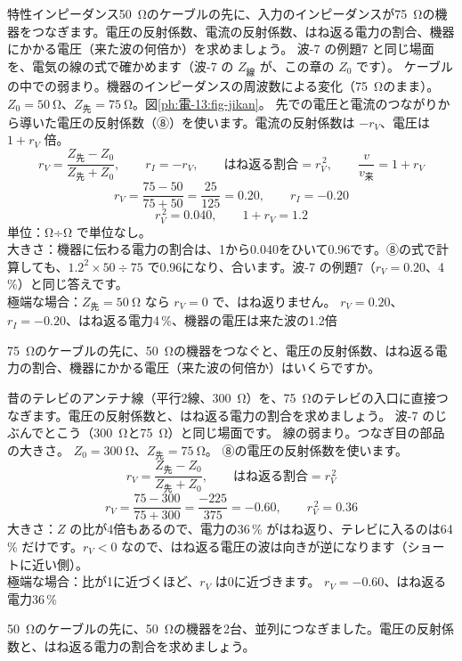 \label{ph:電-13:ex3}
\begin{phreidai}
特性インピーダンス\qty{50}{\ohm}のケーブルの先に、入力のインピーダンスが\qty{75}{\ohm}の機器をつなぎます。電圧の反射係数、電流の反射係数、はね返る電力の割合、機器にかかる電圧（来た波の何倍か）を求めましょう。
\phbamen
波-7 の例題7 と同じ場面を、電気の線の式で確かめます（波-7 の $Z_{\text{線}}$ が、この章の $Z_0$ です）。
\phmushi
ケーブルの中での弱まり。機器のインピーダンスの周波数による変化（\qty{75}{\ohm}のまま）。
\phzu
$Z_0=\qty{50}{\ohm}$、$Z_{\text{先}}=\qty{75}{\ohm}$。図\ref{ph:電-13:fig-jikan}。
\phriyu
先での電圧と電流のつながりから導いた電圧の反射係数（⑧）を使います。電流の反射係数は $-r_V$、電圧は $1+r_V$ 倍。
\phtateru
\[r_V=\frac{Z_{\text{先}}-Z_0}{Z_{\text{先}}+Z_0},\qquad r_I=-r_V,\qquad\text{はね返る割合}=r_V^{\,2},\qquad\frac{v}{v_{\text{来}}}=1+r_V\]
\phtoku
\[r_V=\frac{75-50}{75+50}=\frac{25}{125}=0.20,\qquad r_I=-0.20\]
\[r_V^{\,2}=0.040,\qquad1+r_V=1.2\]
\phtashikame
単位：Ω÷Ω で単位なし。\\
大きさ：機器に伝わる電力の割合は、1から0.040をひいて0.96です。⑧の式で計算しても、$1.2^2\times50\div75$ で0.96になり、合います。波-7 の例題7（$r_V=0.20$、4\,\%）と同じ答えです。\\
極端な場合：$Z_{\text{先}}=\qty{50}{\ohm}$ なら $r_V=0$ で、はね返りません。
\kotae $r_V=0.20$、$r_I=-0.20$、はね返る電力4\,\%、機器の電圧は来た波の1.2倍
\end{phreidai}
\begin{jibun}
\qty{75}{\ohm}のケーブルの先に、\qty{50}{\ohm}の機器をつなぐと、電圧の反射係数、はね返る電力の割合、機器にかかる電圧（来た波の何倍か）はいくらですか。
\end{jibun}

\label{ph:電-13:ex4}
\begin{phreidai}
昔のテレビのアンテナ線（平行2線、\qty{300}{\ohm}）を、\qty{75}{\ohm}のテレビの入口に直接つなぎます。電圧の反射係数と、はね返る電力の割合を求めましょう。
\phbamen
波-7 のじぶんでとこう（\qty{300}{\ohm}と\qty{75}{\ohm}）と同じ場面です。
\phmushi
線の弱まり。つなぎ目の部品の大きさ。
\phzu
$Z_0=\qty{300}{\ohm}$、$Z_{\text{先}}=\qty{75}{\ohm}$。
\phriyu
⑧の電圧の反射係数を使います。
\phtateru
\[r_V=\frac{Z_{\text{先}}-Z_0}{Z_{\text{先}}+Z_0},\qquad\text{はね返る割合}=r_V^{\,2}\]
\phtoku
\[r_V=\frac{75-300}{75+300}=\frac{-225}{375}=-0.60,\qquad r_V^{\,2}=0.36\]
\phtashikame
大きさ：$Z$ の比が4倍もあるので、電力の36\,\% がはね返り、テレビに入るのは64\,\% だけです。$r_V<0$ なので、はね返る電圧の波は向きが逆になります（ショートに近い側）。\\
極端な場合：比が1に近づくほど、$r_V$ は0に近づきます。
\kotae $r_V=-0.60$、はね返る電力36\,\%
\end{phreidai}
\begin{jibun}
\qty{50}{\ohm}のケーブルの先に、\qty{50}{\ohm}の機器を2台、並列につなぎました。電圧の反射係数と、はね返る電力の割合を求めましょう。
\end{jibun}


